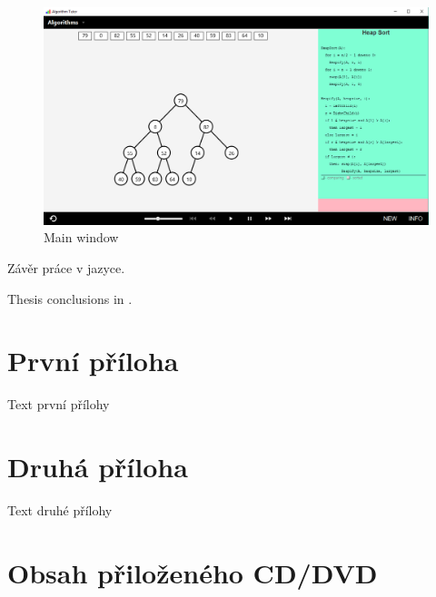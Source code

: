 \documentclass[
  field=inf,
  biblatex,
  language=english,
  glossaries,
  theorems=false,
  index
]{kidiplom}
\begin{document}
\begin{figure}[H]
\begin{center}
	
	\includegraphics[width=\textwidth]{img/UI.png}
	\caption{Main window}\label{fig:ui}
\end{center}
\end{figure}

\begin{kiconclusions}
Závěr práce v  jazyce.
\end{kiconclusions}

\begin{kiconclusions}[english]
Thesis conclusions in .
\end{kiconclusions}

\appendix

\section{První příloha}
Text první přílohy

\section{Druhá příloha}
Text druhé přílohy

\section{Obsah přiloženého CD/DVD} \label{sec:ObsahCD}
\end{document}
